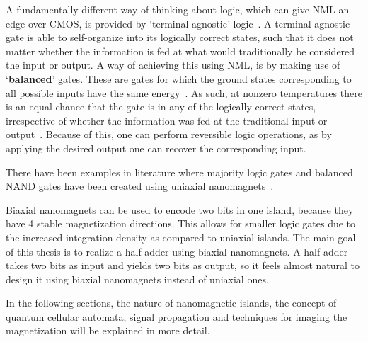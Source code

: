 \documentclass[11pt,a4paper,english,twoside]{article}
\begin{document}
A fundamentally different way of thinking about logic, which can give NML an edge over CMOS, is provided by `terminal-agnostic' logic~\cite{FactorizationMemcomputing}. A terminal-agnostic gate is able to self-organize into its logically correct states, such that it does not matter whether the information is fed at what would traditionally be considered the input or output. A way of achieving this using NML, is by making use of `\textbf{balanced}' gates. These are gates for which the ground states corresponding to all possible inputs have the same energy~\cite{GYP-18}. As such, at nonzero temperatures there is an equal chance that the gate is in any of the logically correct states, irrespective of whether the information was fed at the traditional input or output~\cite{gypens2020nanomagnetic}. Because of this, one can perform reversible logic operations, as by applying the desired output one can recover the corresponding input. \par 
There have been examples in literature where majority logic gates and balanced NAND gates have been created using uniaxial nanomagnets~\cite{GYP-18}. \par
Biaxial nanomagnets can be used to encode two bits in one island, because they have 4 stable magnetization directions. This allows for smaller logic gates due to the increased integration density as compared to uniaxial islands. The main goal of this thesis is to realize a half adder using biaxial nanomagnets. A half adder takes two bits as input and yields two bits as output, so it feels almost natural to design it using biaxial nanomagnets instead of uniaxial ones. \par
In the following sections, the nature of nanomagnetic islands, the concept of quantum cellular automata, signal propagation and techniques for imaging the magnetization will be explained in more detail.
\end{document}
